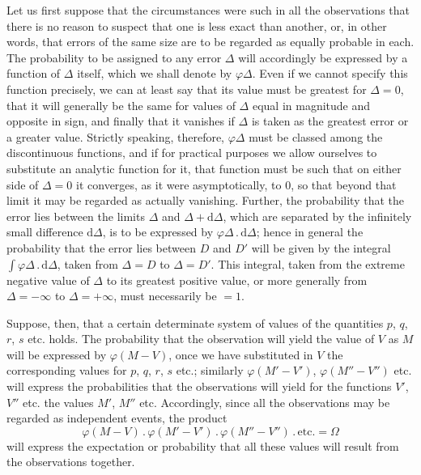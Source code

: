 Let us first suppose that the circumstances were such in all the observations that there is no reason to suspect that one is less exact than another, or, in other words, that errors of the same size are to be regarded as equally probable in each. The probability to be assigned to any error $\Delta$ will accordingly be expressed by a function of $\Delta$ itself, which we shall denote by $\varphi\Delta$. Even if we cannot specify this function precisely, we can at least say that its value must be greatest for $\Delta=0$, that it will generally be the same for values of $\Delta$ equal in magnitude and opposite in sign, and finally that it vanishes if $\Delta$ is taken as the greatest error or a greater value. Strictly speaking, therefore, $\varphi\Delta$ must be classed among the discontinuous functions, and if for practical purposes we allow ourselves to substitute an analytic function for it, that function must be such that on either side of $\Delta=0$ it converges, as it were asymptotically, to $0$, so that beyond that limit it may be regarded as actually vanishing. Further, the probability that the error lies between the limits $\Delta$ and $\Delta+\mathrm{d}\Delta$, which are separated by the infinitely small difference $\mathrm{d}\Delta$, is to be expressed by $\varphi\Delta\, .\,\mathrm{d}\Delta$; hence in general the probability that the error lies between $D$ and $D'$ will be given by the integral $\int\varphi\Delta\, .\,\mathrm{d}\Delta$, taken from $\Delta=D$ to $\Delta=D'$. This integral, taken from the extreme negative value of $\Delta$ to its greatest positive value, or more generally from $\Delta=-\infty$ to $\Delta=+\infty$, must necessarily be $=1$.

Suppose, then, that a certain determinate system of values of the quantities $p$, $q$, $r$, $s$ etc. holds. The probability that the observation will yield the value of $V$ as $M$ will be expressed by $\varphi(M-V)$, once we have substituted in $V$ the corresponding values for $p$, $q$, $r$, $s$ etc.; similarly $\varphi(M'-V')$, $\varphi(M''-V'')$ etc. will express the probabilities that the observations will yield for the functions $V'$, $V''$ etc. the values $M'$, $M''$ etc. Accordingly, since all the observations may be regarded as independent events, the product
\[
\varphi(M-V)\, .\,\varphi(M'-V')\, .\,\varphi(M''-V'')\, .\,\text{etc.}=\Omega
\]
will express the expectation or probability that all these values will result from the observations together.
